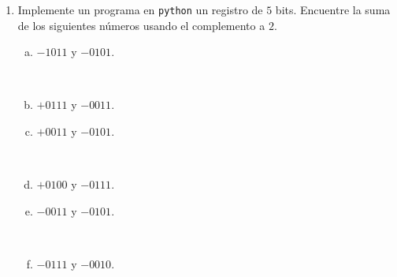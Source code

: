 \documentclass[
	spanish,
	8pt,
	utf8,
	xcolor=table,
	handout,
	aspectratio=169,
	professionalfonts,
	notheorems,
	mathserif,
]{beamer}
\newcounter{savedenum}
\newcommand*{\saveenum}{\setcounter{savedenum}{\theenumi}}
\begin{document}
\begin{frame}
\begin{enumerate}
		\item

		      Implemente un programa en \texttt{python} un registro de
		      $5$ bits.
		      Encuentre la suma de los siguientes números usando el
		      complemento a $2$.


		      \begin{multicols}{3}
			      \begin{enumerate}[a)]
				      \item

				            $-1011$ y $-0101$.

				            \

				      \item

				            $+0111$ y $-0011$.



				      \item

				            $+0011$ y $-0101$.

				            \

				      \item

				            $+0100$ y $-0111$.



				      \item

				            $-0011$ y $-0101$.

				            \
				      \item

				            $-0111$ y $-0010$.
			      \end{enumerate}
		      \end{multicols}

		      \saveenum
	\end{enumerate}
\end{frame}
\end{document}
